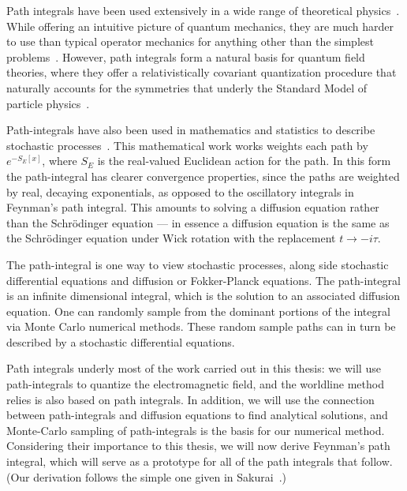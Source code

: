     Path integrals have been used extensively in a wide range of theoretical physics~\cite{Kleinert2012}.
    While offering an intuitive picture of quantum mechanics, they are much harder to use 
    than typical operator mechanics for anything other than the simplest problems~\cite{Feynman1965}.
    However, path integrals form a natural basis for quantum field theories, where they offer a relativistically covariant
    quantization procedure that naturally accounts for the symmetries 
    that underly the Standard Model of particle physics~\cite{Brown1994,Srednicki2008}.

    Path-integrals have also been used in mathematics and statistics to describe stochastic 
    processes~\cite{Kac1949,Durrett1996, Karatzas1991}.  This mathematical work works weights each
    path by $e^{-S_{E}[x]}$, where $S_E$ is the real-valued Euclidean action for the path.
    In this form the path-integral has clearer convergence properties, 
    since the paths are weighted by real, decaying exponentials, as opposed to the oscillatory integrals
    in Feynman's path integral.  This amounts to solving a diffusion equation rather than the Schr\"odinger equation
    --- in essence a diffusion equation is the same as the Schr\"odinger equation under Wick rotation 
    with the replacement $t\rightarrow -i\tau$.

    The path-integral is one way to view stochastic processes, along side stochastic differential
    equations and diffusion or Fokker-Planck equations. 
    The path-integral is an infinite dimensional integral, which is the solution to an associated 
    diffusion equation.  One can randomly sample from the 
    dominant portions of the integral via Monte Carlo numerical methods.  These random sample paths can
    in turn be described by a stochastic differential equations.  %
        
    Path integrals underly most of the work carried out in this thesis: we will use path-integrals
    to quantize the electromagnetic field, and the worldline method relies is also based on path integrals.
    In addition, we will use the connection between path-integrals and diffusion equations
    to find analytical solutions, and Monte-Carlo sampling of path-integrals is the basis for our numerical
    method.      Considering their importance to this thesis, we will 
    now derive Feynman's path integral, which will serve as a prototype for all of the path integrals
    that follow.  (Our derivation follows the simple one given in Sakurai~\cite{Sakurai1994}.)

